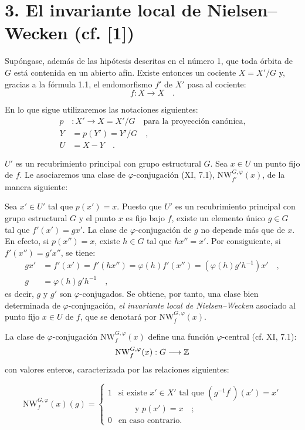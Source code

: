 \section*{3. El invariante local de Nielsen--Wecken (cf. [1])}
Supóngase, además de las hipótesis descritas en el número 1, que toda órbita de $G$ está contenida en un abierto afín. Existe entonces un cociente $X = X'/G$ y, gracias a la fórmula 1.1, el endomorfismo $f'$ de $X'$ pasa al cociente:
\[
f : X \longrightarrow X \quad .
\]

En lo que sigue utilizaremos las notaciones siguientes:
\begin{align*}
p &: X' \longrightarrow X = X'/G \quad \text{para la proyección canónica,} \\
Y &= p(Y') = Y'/G \quad , \\
U &= X - Y \quad .
\end{align*}

$U'$ es un recubrimiento principal con grupo estructural $G$. Sea $x \in U$ un punto fijo de $f$. Le asociaremos una clase de $\varphi$-conjugación (XI, 7.1), $\mathrm{NW}_{f'}^{G,\varphi}(x)$, de la manera siguiente:

Sea $x' \in U'$ tal que $p(x') = x$. Puesto que $U'$ es un recubrimiento principal con grupo estructural $G$ y el punto $x$ es fijo bajo $f$, existe un elemento único $g \in G$ tal que $f'(x') = gx'$. La clase de $\varphi$-conjugación de $g$ no depende más que de $x$. En efecto, si $p(x'') = x$, existe $h \in G$ tal que $hx'' = x'$. Por consiguiente, si $f'(x'') = g'x''$, se tiene:
\begin{align*}
gx' &= f'(x') = f'(hx'') = \varphi(h)f'(x'') = (\varphi(h)g'h^{-1})x' \quad , \\
g &= \varphi(h)g'h^{-1} \quad ,
\end{align*}
es decir, $g$ y $g'$ son $\varphi$-conjugados. Se obtiene, por tanto, una clase bien determinada de $\varphi$-conjugación, \emph{el invariante local de Nielsen--Wecken} asociado al punto fijo $x \in U$ de $f$, que se denotará por $\mathrm{NW}_{f}^{G,\varphi}(x)$.

La clase de $\varphi$-conjugación $\mathrm{NW}_{f}^{G,\varphi}(x)$ define una función $\varphi$-central (cf. XI, 7.1):
\[
\mathrm{NW}_{f}^{G,\varphi}(x) : G \longrightarrow \mathbb Z
\]
con valores enteros, caracterizada por las relaciones siguientes:

\begin{equation}\tag{3.1}
\mathrm{NW}_{f}^{G,\varphi}(x)(g) = \begin{cases} 1 & \text{si existe } x' \in X' \text{ tal que } (g^{-1}f^{\prime})(x') = x' \\ & \qquad \text{y } p(x') = x \quad ; \\ 0 & \text{en caso contrario.} \end{cases}
\end{equation}
